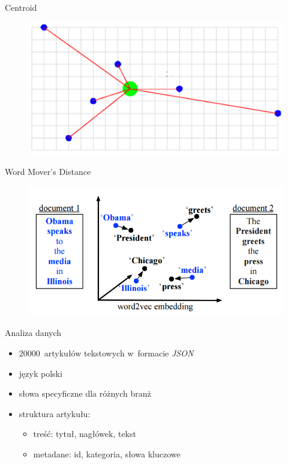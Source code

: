 \documentclass{beamer}
\begin{document}
	\begin{frame}{Centroid}
		\begin{figure}
			\centering
			\includegraphics[width=1\textwidth]{img/centroid.png}
		\end{figure}
	\end{frame}
	\begin{frame}{Word Mover's Distance}
		\begin{figure}
			\centering
			\includegraphics[width=1\textwidth]{img/wmd.png}
		\end{figure}
	\end{frame}
	\begin{frame}{Analiza danych}
		\begin{itemize}
			\item 20000~artykułów tekstowych w~formacie \textit{JSON}
			\item język polski
			\item słowa specyficzne dla różnych branż
			\item struktura artykułu:
			\begin{itemize}
				\item treść: tytuł, nagłówek, tekst
				\item metadane: id, kategoria, słowa kluczowe
			\end{itemize}
		\end{itemize}
	\end{frame}
\end{document}
